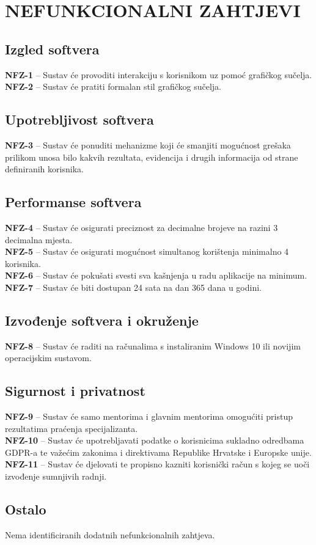 \documentclass{scrreprt}
\begin{document}
\chapter{NEFUNKCIONALNI ZAHTJEVI}

\section{Izgled softvera}
\textbf{NFZ-1} – Sustav će provoditi interakciju s korisnikom uz pomoć grafičkog sučelja.\\
\textbf{NFZ-2} – Sustav će pratiti formalan stil grafičkog sučelja.

\section{Upotrebljivost softvera}
\textbf{NFZ-3} – Sustav će ponuditi mehanizme koji će smanjiti mogućnost grešaka prilikom unosa bilo kakvih rezultata, evidencija i drugih informacija od strane definiranih korisnika.

\section{Performanse softvera}
\textbf{NFZ-4} – Sustav će osigurati preciznost za decimalne brojeve na razini 3 decimalna mjesta.\\
\textbf{NFZ-5} – Sustav će osigurati mogućnost simultanog korištenja minimalno 4 korisnika.\\
\textbf{NFZ-6} – Sustav će pokušati svesti sva kašnjenja u radu aplikacije na minimum.\\
\textbf{NFZ-7} – Sustav će biti dostupan 24 sata na dan 365 dana u godini. 

\section{Izvođenje softvera i okruženje}
\textbf{NFZ-8} – Sustav će raditi na računalima s instaliranim Windows 10 ili novijim operacijskim sustavom.

\section{Sigurnost i privatnost}
\textbf{NFZ-9} – Sustav će samo mentorima i glavnim mentorima omogućiti pristup rezultatima praćenja specijalizanta.\\
\textbf{NFZ-10} – Sustav će upotrebljavati podatke o korisnicima sukladno odredbama GDPR-a te važećim zakonima i direktivama Republike Hrvatske i Europske unije.\\
\textbf{NFZ-11} – Sustav će djelovati te propisno kazniti korisnički račun s kojeg se uoči izvođenje sumnjivih radnji.

\section{Ostalo}
Nema identificiranih dodatnih nefunkcionalnih zahtjeva.
\end{document}
